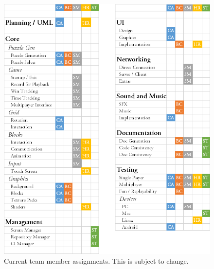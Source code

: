 \documentclass[12pt]{article}
\begin{document}
    \begin{figure}[H]
        \centering
        \includegraphics[width=5in]{Assignments.png}
        \caption{Current team member assignments. This is subject to change.}
    \end{figure}



\end{document}
